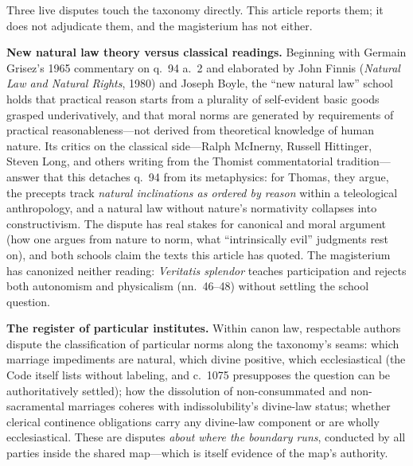 Three live disputes touch the taxonomy directly. This article reports them; it does not adjudicate them, and the magisterium has not either.

\textbf{New natural law theory versus classical readings.} Beginning with Germain Grisez's 1965 commentary on q.~94 a.~2 and elaborated by John Finnis (\emph{Natural Law and Natural Rights}, 1980) and Joseph Boyle, the ``new natural law'' school holds that practical reason starts from a plurality of self-evident basic goods grasped underivatively, and that moral norms are generated by requirements of practical reasonableness---not derived from theoretical knowledge of human nature. Its critics on the classical side---Ralph McInerny, Russell Hittinger, Steven Long, and others writing from the Thomist commentatorial tradition---answer that this detaches q.~94 from its metaphysics: for Thomas, they argue, the precepts track \emph{natural inclinations as ordered by reason} within a teleological anthropology, and a natural law without nature's normativity collapses into constructivism. The dispute has real stakes for canonical and moral argument (how one argues from nature to norm, what ``intrinsically evil'' judgments rest on), and both schools claim the texts this article has quoted. The magisterium has canonized neither reading: \emph{Veritatis splendor} teaches participation and rejects both autonomism and physicalism (nn.~46--48) without settling the school question.

\textbf{The register of particular institutes.} Within canon law, respectable authors dispute the classification of particular norms along the taxonomy's seams: which marriage impediments are natural, which divine positive, which ecclesiastical (the Code itself lists without labeling, and c.~1075 presupposes the question can be authoritatively settled); how the dissolution of non-consummated and non-sacramental marriages coheres with indissolubility's divine-law status; whether clerical continence obligations carry any divine-law component or are wholly ecclesiastical. These are disputes \emph{about where the boundary runs}, conducted by all parties inside the shared map---which is itself evidence of the map's authority.

